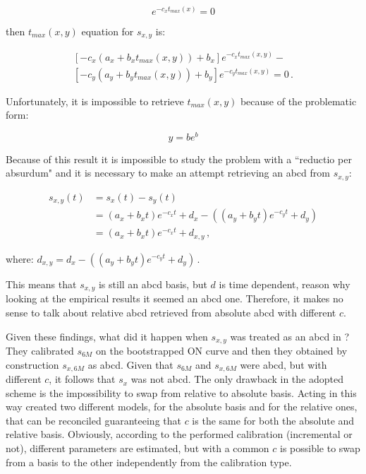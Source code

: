 {\begin{equation}
[-c_{x}(a_{x}+b_{x}t_{max}(x))+b_{x}]e^{-c_{x}t_{max}(x)}=0
\label{eqn:equation_max_time}
\end{equation}

then $t_{max}(x,y)$ equation for $s_{x,y}$ is:

\begin{equation}
\begin{split}
 [-c_{x}(a_{x}+b_{x}t_{max}(x,y))+b_{x}]e^{-c_{x}t_{max}(x,y)}-\\
 [-c_{y}(a_{y}+b_{y}t_{max}(x,y))+b_{y}]e^{-c_{y}t_{max}(x,y)}=0\,.
\label{eq:t_max_relative}
\end{split}
\end{equation}

Unfortunately, it is impossible to retrieve $t_{max}(x,y)$ because of the problematic form:

\begin{equation}
    y=b e^{b}
\label{eq:problem}
\end{equation}

Because of this result it is impossible to study the problem with a ``reductio per absurdum" and it is necessary to make an attempt retrieving an abcd from $s_{x,y}$:

\begin{equation}
\begin{split}
s_{x,y}(t)& =s_{x}(t)-s_{y}(t)\\
& =(a_{x}+b_{x}t)e^{-c_{x}t}+d_{x}-((a_{y}+b_{y}t)e^{-c_{y}t}+d_{y})\\
&=(a_{x}+b_{x}t)e^{-c_{x}t}+d_{x,y}\,,
\end{split}
\label{eq:s_x,y_is_abcd}
\end{equation}

where: $d_{x,y}=d_{x}-((a_{y}+b_{y}t)e^{-c_{y}t}+d_{y})$\,.


This means that $s_{x,y}$ is still an abcd basis, but $d$ is time dependent, reason why looking at the empirical results it seemed an abcd one.
Therefore, it makes no sense to talk about relative abcd retrieved from absolute abcd with different $c$.

Given these findings, what did it happen when $s_{x,y}$ was treated as an abcd in \cite{ametrano_ballabio_mazzocchi}? 
They calibrated $s_{6M}$ on the bootstrapped ON curve and then they obtained by construction $s_{x,6M}$ as abcd. Given that $s_{6M}$ and $s_{x,6M}$ were abcd, but with different $c$, it follows that $s_{x}$ was not abcd.
The only drawback in the adopted scheme is the impossibility to swap from relative to absolute basis.
Acting in this way \cite{ametrano_ballabio_mazzocchi} created two different models, for the absolute basis and for the relative ones, that can be reconciled guaranteeing that $c$ is the same for both the absolute and relative basis. 
Obviously, according to the performed calibration (incremental or not), different parameters are estimated, but with a common $c$ is possible to swap from a basis to the other independently from the calibration type.


}
